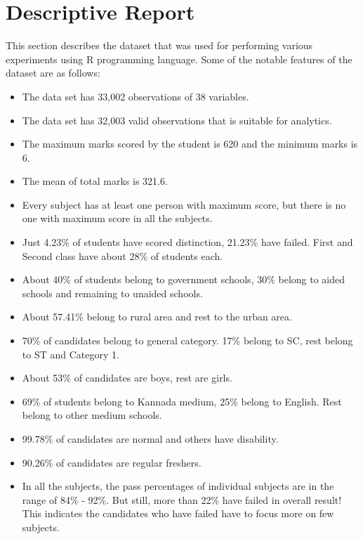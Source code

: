 \section*{Descriptive Report}
This section describes the dataset that was used for performing various experiments using R programming language. Some of the notable features of the dataset are as follows:
\begin{itemize}
	\item
	The 	data set has 33,002 observations of 38 variables.
	\item
	The data set has 32,003 valid observations that is suitable for analytics.
	\item
	The maximum marks scored by the student is 620 and the minimum marks is 6.
	\item
	The mean of total marks is 321.6.
	\item
	Every subject has at least one person with maximum score, but there is no one with maximum score in all the subjects.
	\item
	Just 4.23\% of students have scored distinction, 21.23\% have failed. First and Second class have about 28\% of students each.
	\item
	About 40\% of students belong to government schools, 30\% belong to aided schools and remaining to unaided schools.
	\item
	About 57.41\% belong to rural area and rest to the urban area.
	\item
	70\% of candidates belong to general category. 17\% belong to SC, rest belong to ST and Category 1.
	\item
	About 53\% of candidates are boys, rest are girls.
	\item
	69\% of students belong to Kannada medium, 25\% belong to English. Rest belong to other medium schools.
	\item
	99.78\% of candidates are normal and others have disability.
	\item
	90.26\% of candidates are regular freshers.
	\item
	In all the subjects, the pass percentages of individual subjects are in the range of 84\% - 92\%. But still, more than 22\% have failed in overall result! This indicates the candidates who have failed have to focus more on few subjects.
\end{itemize}